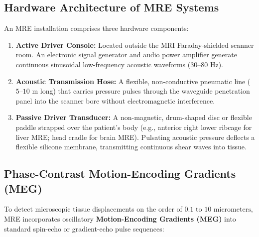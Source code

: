 \documentclass[11pt,a4paper]{article}
\begin{document}
\subsection{Hardware Architecture of MRE Systems}
An MRE installation comprises three hardware components:
\begin{enumerate}
    \item \textbf{Active Driver Console:} Located outside the MRI Faraday-shielded scanner room. An electronic signal generator and audio power amplifier generate continuous sinusoidal low-frequency acoustic waveforms ($30\text{--}80\text{ Hz}$).
    \item \textbf{Acoustic Transmission Hose:} A flexible, non-conductive pneumatic line ($5\text{--}10\text{ m}$ long) that carries pressure pulses through the waveguide penetration panel into the scanner bore without electromagnetic interference.
    \item \textbf{Passive Driver Transducer:} A non-magnetic, drum-shaped disc or flexible paddle strapped over the patient's body (e.g., anterior right lower ribcage for liver MRE; head cradle for brain MRE). Pulsating acoustic pressure deflects a flexible silicone membrane, transmitting continuous shear waves into tissue.
\end{enumerate}

\subsection{Phase-Contrast Motion-Encoding Gradients (MEG)}
To detect microscopic tissue displacements on the order of \textbf{$0.1\text{ to }10\text{ micrometers}$}, MRE incorporates oscillatory \textbf{Motion-Encoding Gradients (MEG)} into standard spin-echo or gradient-echo pulse sequences:
\end{document}
